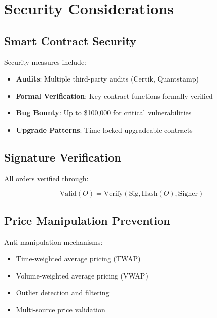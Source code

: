\section{Security Considerations}


\subsection{Smart Contract Security}

Security measures include:

\begin{itemize}
\item \textbf{Audits}: Multiple third-party audits (Certik, Quantstamp)
\item \textbf{Formal Verification}: Key contract functions formally verified
\item \textbf{Bug Bounty}: Up to \$100,000 for critical vulnerabilities
\item \textbf{Upgrade Patterns}: Time-locked upgradeable contracts
\end{itemize}

\subsection{Signature Verification}

All orders verified through:

\begin{equation}
\text{Valid}(O) = \text{Verify}(\text{Sig}, \text{Hash}(O), \text{Signer})
\end{equation}

\subsection{Price Manipulation Prevention}

Anti-manipulation mechanisms:

\begin{itemize}
\item Time-weighted average pricing (TWAP)
\item Volume-weighted average pricing (VWAP)
\item Outlier detection and filtering
\item Multi-source price validation
\end{itemize}

